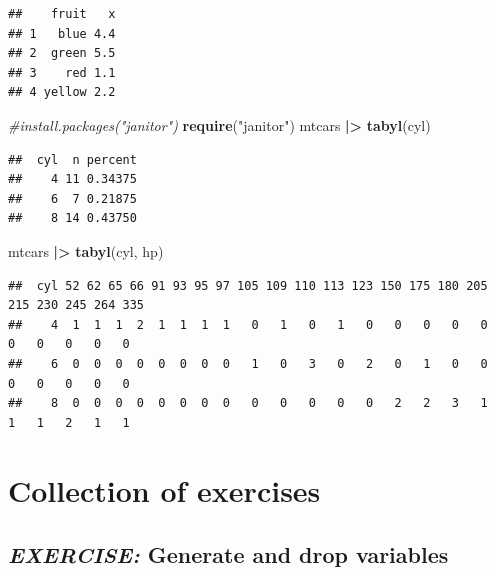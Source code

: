 \documentclass[
  12pt,
  oneside]{book}
\newenvironment{Shaded}{\begin{snugshade}}{\end{snugshade}}
\newcommand{\CommentTok}[1]{\textcolor[rgb]{0.56,0.35,0.01}{\textit{#1}}}
\newcommand{\FunctionTok}[1]{\textcolor[rgb]{0.13,0.29,0.53}{\textbf{#1}}}
\newcommand{\NormalTok}[1]{#1}
\newcommand{\SpecialCharTok}[1]{\textcolor[rgb]{0.81,0.36,0.00}{\textbf{#1}}}
\newcommand{\StringTok}[1]{\textcolor[rgb]{0.31,0.60,0.02}{#1}}
\begin{document}
\begin{verbatim}
##    fruit   x
## 1   blue 4.4
## 2  green 5.5
## 3    red 1.1
## 4 yellow 2.2
\end{verbatim}

\begin{Shaded}
\begin{Highlighting}[]
\CommentTok{\#install.packages("janitor")}
\FunctionTok{require}\NormalTok{(}\StringTok{"janitor"}\NormalTok{)}
\NormalTok{mtcars }\SpecialCharTok{|\textgreater{}} 
  \FunctionTok{tabyl}\NormalTok{(cyl) }
\end{Highlighting}
\end{Shaded}

\begin{verbatim}
##  cyl  n percent
##    4 11 0.34375
##    6  7 0.21875
##    8 14 0.43750
\end{verbatim}

\begin{Shaded}
\begin{Highlighting}[]
\NormalTok{mtcars }\SpecialCharTok{|\textgreater{}} 
  \FunctionTok{tabyl}\NormalTok{(cyl, hp) }
\end{Highlighting}
\end{Shaded}

\begin{verbatim}
##  cyl 52 62 65 66 91 93 95 97 105 109 110 113 123 150 175 180 205 215 230 245 264 335
##    4  1  1  1  2  1  1  1  1   0   1   0   1   0   0   0   0   0   0   0   0   0   0
##    6  0  0  0  0  0  0  0  0   1   0   3   0   2   0   1   0   0   0   0   0   0   0
##    8  0  0  0  0  0  0  0  0   0   0   0   0   0   2   2   3   1   1   1   2   1   1
\end{verbatim}

\hypertarget{collection-of-exercises}{%
\chapter{Collection of exercises}\label{collection-of-exercises}}

\hypertarget{exercise-generate-and-drop-variables}{%
\section*{\texorpdfstring{\emph{EXERCISE:} Generate and drop variables}{EXERCISE: Generate and drop variables}}\label{exercise-generate-and-drop-variables}}
\end{document}
